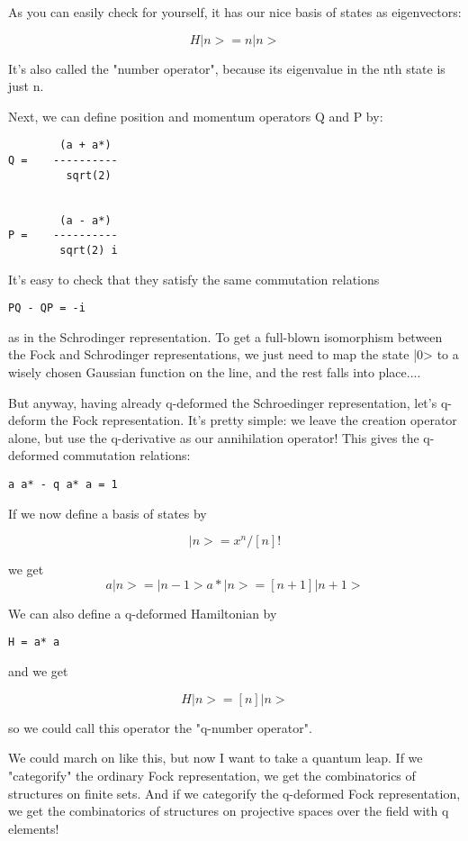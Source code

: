 As you can easily check for yourself, it has our nice basis of states 
as eigenvectors:

$$
H|n> = n |n>
$$
    
It's also called the "number operator", because its eigenvalue in the
nth state is just n.

Next, we can define position and momentum operators Q and P by:
      
\begin{verbatim}
        (a + a*) 
Q =    ----------
         sqrt(2)


        (a - a*) 
P =    ----------
        sqrt(2) i
\end{verbatim}
    
It's easy to check that they satisfy the same commutation relations

\begin{verbatim}
PQ - QP = -i
\end{verbatim}
    
as in the Schrodinger representation.  To get a full-blown isomorphism
between the Fock and Schrodinger representations, we just need to map
the state |0> to a wisely chosen Gaussian function on the line, and
the rest falls into place....

But anyway, having already q-deformed the Schroedinger representation,
let's q-deform the Fock representation.  It's pretty simple: we leave
the creation operator alone, but use the q-derivative as our annihilation
operator!  This gives the q-deformed commutation relations:

\begin{verbatim}
a a* - q a* a = 1
\end{verbatim}
    
If we now define a basis of states by 

$$
|n> = x^{n} / [n]!
$$
    
we get 
$$
 a|n>  =        |n-1>
a*|n>  =  [n+1] |n+1>
$$
    
We can also define a q-deformed Hamiltonian by

\begin{verbatim}
H = a* a
\end{verbatim}
    
and we get

$$
H|n> = [n] |n>
$$
    
so we could call this operator the "q-number operator".  

We could march on like this, but now I want to take a quantum leap.   
If we "categorify" the ordinary Fock representation, we get the
combinatorics of structures on finite sets.  And if we categorify the
q-deformed Fock representation, we get the combinatorics of structures
on projective spaces over the field with q elements!

